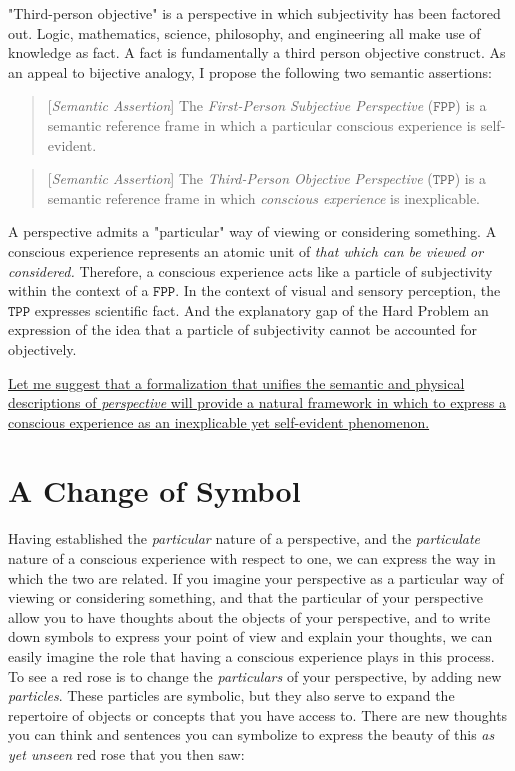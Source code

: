 \documentclass[runningheads]{llncs}
\begin{document}
"Third-person objective" is a perspective in which subjectivity has been factored out. Logic, mathematics, science, philosophy, and engineering all make use of knowledge as fact. A fact is fundamentally a third person objective construct. As an appeal to bijective analogy, I propose the following two semantic assertions:

\begin{quote}
[\emph{Semantic Assertion}] The \emph{First-Person Subjective Perspective} ($\texttt{FPP}$) is a semantic reference frame in which a particular conscious experience is self-evident.
\end{quote}

\begin{quote}
[\emph{Semantic Assertion}] The \emph{Third-Person Objective Perspective} ($\texttt{TPP}$) is a semantic reference frame in which \emph{conscious experience} is inexplicable.
\end{quote}

A perspective admits a "particular" way of viewing or considering something. A conscious experience represents an atomic unit of \emph{that which can be viewed or considered.} Therefore, a conscious experience acts like a particle of subjectivity within the context of a $\texttt{FPP}$. In the context of visual and sensory perception, the $\texttt{TPP}$ expresses scientific fact. And the explanatory gap of the Hard Problem an expression of the idea that a particle of subjectivity cannot be accounted for objectively.

\href{../a-novel-perspective/a-novel-perspective.html}{Let me suggest that a formalization that unifies the semantic and physical descriptions of \emph{perspective} will provide a natural framework in which to express a conscious experience as an inexplicable yet self-evident phenomenon.}\xspace

\section{A Change of Symbol}

Having established the \emph{particular} nature of a perspective, and the \emph{particulate} nature of a conscious experience with respect to one, we can express the way in which the two are related. If you imagine your perspective as a particular way of viewing or considering something, and that the particular of your perspective allow you to have thoughts about the objects of your perspective, and to write down symbols to express your point of view and explain your thoughts, we can easily imagine the role that having a conscious experience plays in this process. To see a red rose is to change the \emph{particulars} of your perspective, by adding new \emph{particles}. These particles are symbolic, but they also serve to expand the repertoire of objects or concepts that you have access to. There are new thoughts you can think and sentences you can symbolize to express the beauty of this \emph{as yet unseen} red rose that you then saw:
\end{document}
